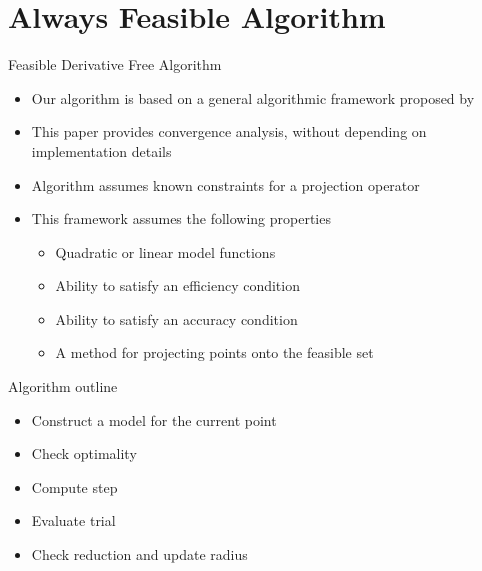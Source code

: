 \documentclass{beamer}
\begin{document}



\section{Always Feasible Algorithm}


\begin{frame}{Feasible Derivative Free Algorithm}
	\begin{itemize}
		\item Our algorithm is based on a general algorithmic framework proposed by \cite{CONEJO2013324}
		\item This paper provides convergence analysis, without depending on implementation details
		\item \color{red} Algorithm assumes known constraints for a projection operator \color{black}
		\item This framework assumes the following properties
			\begin{itemize}
				\item Quadratic or linear model functions
				\item Ability to satisfy an efficiency condition
				\item Ability to satisfy an accuracy condition
				\item A method for projecting points onto the feasible set
			\end{itemize}
	\end{itemize}
\end{frame}


\begin{frame}{Algorithm outline}
	\begin{itemize}
		\item Construct a model for the current point
		\item Check optimality
		\item Compute step
		\item Evaluate trial
		\item Check reduction and update radius
	\end{itemize}
\end{frame}
\end{document}
